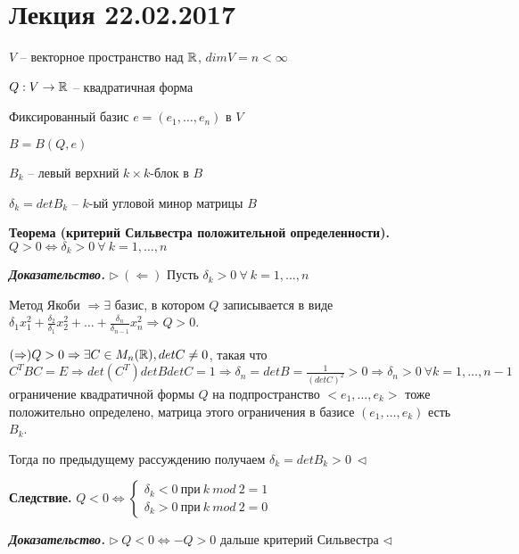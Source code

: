 \section{Лекция 22.02.2017}

$V$ -- векторное пространство над $\mathbb{R}$, $dimV = n < \infty$

$Q: V \rightarrow \mathbb{R}$ -- квадратичная форма

Фиксированный базис $e = (e_1, \dots, e_n)$ в $V$

$B = B(Q, e)$

$B_k$ -- левый верхний $k \times k$-блок в $B$

$\delta_k = det B_k$ -- $k$-ый угловой минор матрицы $B$

\vspace{\baselineskip}
\textbf{Теорема (критерий Сильвестра положительной определенности).} $Q > 0 \Leftrightarrow \delta_k > 0 \ \forall \ k = 1, \dots, n$

\vspace{\baselineskip}
\textbf{\textit{Доказательство.}} $\rhd \ (\Leftarrow)$ Пусть $\delta_k > 0 \ \forall \ k = 1, \dots, n$

Метод Якоби $\Rightarrow \exists$ базис, в котором $Q$ записывается в виде $\delta_1 x_1^2 + \frac{\delta_2}{\delta_1} x_2^2 + \dots + \frac{\delta_n}{\delta_{n-1}} x_n^2 \Rightarrow Q > 0$.

$(\Rightarrow) Q > 0 \Rightarrow \exists C \in M_n(\mathbb{R}), detC \neq 0$, такая что $C^T B C = E \Rightarrow det(C^T) det B det C = 1 \Rightarrow \delta_n = det B = \frac{1}{(det C)^2} > 0 \Rightarrow \delta_n > 0 \ \forall k = 1, \dots, n-1$ ограничение квадратичной формы $Q$ на подпространство $<e_1, \dots, e_k>$ тоже положительно определено, матрица этого ограничения в базисе $(e_1, \dots, e_k)$ есть $B_k$.

Тогда по предыдущему рассуждению получаем $\delta_k = det B_k > 0 \ \lhd$

\vspace{\baselineskip}
\textbf{Следствие.} $Q < 0 \Leftrightarrow \begin{cases} \delta_k < 0 \ при \ k \ mod \ 2 = 1 \\
\delta_k > 0 \ при \ k \ mod \ 2 = 0 \end{cases}$

\vspace{\baselineskip}
\textbf{\textit{Доказательство.}} $\rhd \ Q < 0 \Leftrightarrow - Q > 0$ дальше критерий Сильвестра $\lhd$  

\vspace{\baselineskip}
